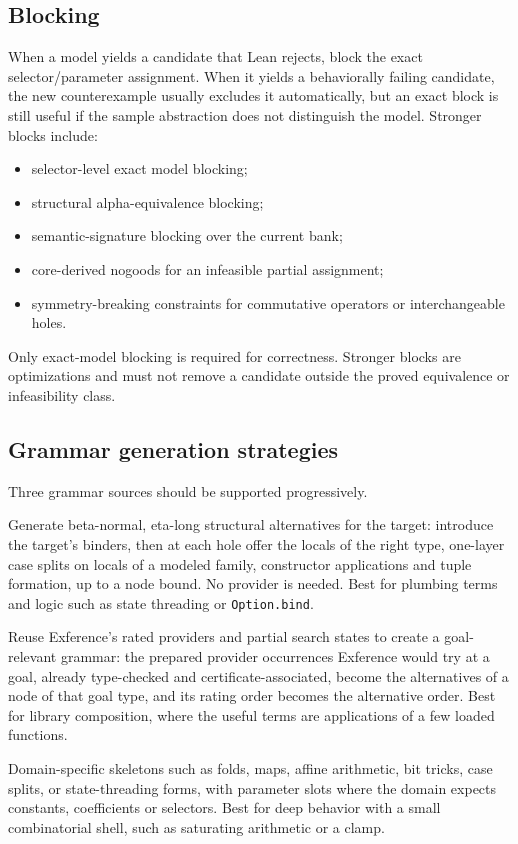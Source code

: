 \documentclass[11pt,oneside]{report}
\newcommand{\code}[1]{\texttt{#1}}
\begin{document}
\subsection{Blocking}

When a model yields a candidate that Lean rejects, block the exact selector/parameter assignment. When it yields a behaviorally failing candidate, the new counterexample usually excludes it automatically, but an exact block is still useful if the sample abstraction does not distinguish the model. Stronger blocks include:

\begin{itemize}[leftmargin=2em]
\item selector-level exact model blocking;
\item structural alpha-equivalence blocking;
\item semantic-signature blocking over the current bank;
\item core-derived nogoods for an infeasible partial assignment;
\item symmetry-breaking constraints for commutative operators or interchangeable holes.
\end{itemize}

Only exact-model blocking is required for correctness. Stronger blocks are optimizations and must not remove a candidate outside the proved equivalence or infeasibility class.

\subsection{Grammar generation strategies}

Three grammar sources should be supported progressively.

\begin{description}[leftmargin=2.2em,style=nextline]
\item[Bounded normal forms.] Generate beta-normal, eta-long structural alternatives for the target: introduce the target's binders, then at each hole offer the locals of the right type, one-layer case splits on locals of a modeled family, constructor applications and tuple formation, up to a node bound. No provider is needed. Best for plumbing terms and logic such as state threading or \code{Option.bind}.
\item[Exference frontier extraction.] Reuse Exference's rated providers and partial search states to create a goal-relevant grammar: the prepared provider occurrences Exference would try at a goal, already type-checked and certificate-associated, become the alternatives of a node of that goal type, and its rating order becomes the alternative order. Best for library composition, where the useful terms are applications of a few loaded functions.
\item[Template families.] Domain-specific skeletons such as folds, maps, affine arithmetic, bit tricks, case splits, or state-threading forms, with parameter slots where the domain expects constants, coefficients or selectors. Best for deep behavior with a small combinatorial shell, such as saturating arithmetic or a clamp.
\end{description}
\end{document}

